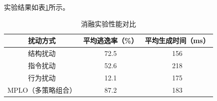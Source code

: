 实验结果如表\ref{tab:5.11}所示。


\begin{table}[htbp]
	\centering
	\caption{消融实验性能对比}
	\label{tab:5.11}
	\begin{tabular*}{0.9\textwidth}{@{\extracolsep{\fill}}ccc}
		\toprule
		扰动方式 & 平均逃逸率（\%） & 平均生成时间（ms） \\
		\midrule
		结构扰动 & 72.5 & 156 \\
		指令扰动 & 52.6 & 218 \\
		行为扰动 & 12.1 & 175 \\
		MPLO（多策略组合） & 87.2 & 183 \\
		\bottomrule
	\end{tabular*}
\end{table}





